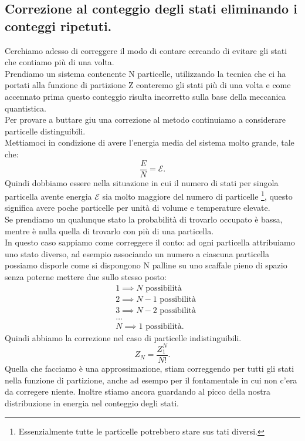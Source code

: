 \subsection{Correzione al conteggio degli stati eliminando i conteggi ripetuti.}%
Cerchiamo adesso di correggere il modo di contare cercando di evitare gli stati che contiamo più di una volta.\\
Prendiamo un sistema contenente N particelle, utilizzando la tecnica che ci ha portati alla funzione di partizione Z conteremo gli stati più di una volta e come accennato prima questo conteggio risulta incorretto sulla base della meccanica quantistica.\\
Per provare a buttare giu una correzione al metodo continuiamo a considerare particelle distinguibili.\\
Mettiamoci in condizione di avere l'energia media del sistema molto grande, tale che:
\[
	\frac{E}{N} = \mathcal{E} 
.\] 
Quindi dobbiamo essere nella situazione in cui il numero di stati per singola particella avente energia $\mathcal{E}$ sia molto maggiore del numero di particelle \footnote{Essenzialmente tutte le particelle potrebbero stare sus tati diversi.}, questo significa avere poche particelle per unità di volume e temperature elevate.\\
Se prendiamo un qualunque stato la probabilità di trovarlo occupato è bassa, mentre è nulla quella di trovarlo con più di una particella.\\
In questo caso sappiamo come correggere il conto: ad ogni particella attribuiamo uno stato diverso, ad esempio associando un numero a ciascuna particella possiamo disporle come si dispongono N palline su uno scaffale pieno di spazio senza poterne mettere due sullo stesso posto:
\begin{align}
	&1 \implies N \text{ possibilità}\\
	&2 \implies N-1 \text{ possibilità}\\
	&3 \implies N-2 \text{ possibilità}\\
	&\ldots\\
	&N \implies 1 \text{ possibilità}
.\end{align}
Quindi abbiamo la correzione nel caso di particelle indistinguibili.
\[
	Z_{N} = \frac{Z_1^{N}}{N!}
.\] 
Quella che facciamo è una approssimazione, stiam correggendo per tutti gli stati nella funzione di partizione, anche ad esempo per il fontamentale in cui non c'era da corregere niente. Inoltre stiamo ancora guardando al picco della nostra distribuzione in energia nel conteggio degli stati.\\
